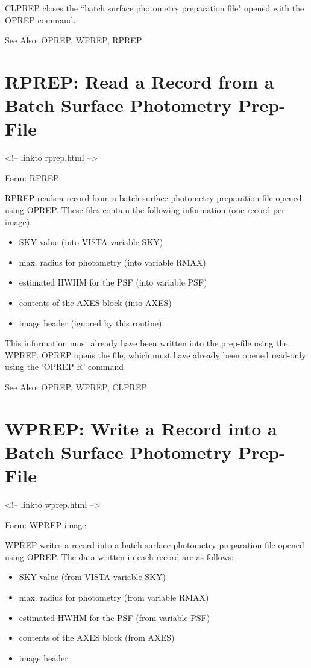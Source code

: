 CLPREP closes the ``batch surface photometry preparation file" opened with
the OPREP command.

See Also:  OPREP, WPREP, RPREP


\section{RPREP: Read a Record from a Batch Surface Photometry Prep-File}
\begin{rawhtml}
<!-- linkto rprep.html -->
\end{rawhtml}
\begin{command}
  \item[Form: RPREP\hfill]{}
\end{command}

RPREP reads a record from a batch surface photometry preparation file
opened using OPREP.  These files contain the following information (one
record per image):
\begin{itemize}
  \item{SKY value (into VISTA variable SKY)}
  \item{max. radius for photometry (into variable RMAX)}
  \item{estimated HWHM for the PSF (into variable PSF)}
  \item{contents of the AXES block (into AXES)}
  \item{image header (ignored by this routine).}
\end{itemize}

This information must already have been written into the prep-file using
the WPREP.  OPREP opens the file, which must have already been opened
read-only using the `OPREP R' command

See Also:  OPREP, WPREP, CLPREP


\section{WPREP: Write a Record into a Batch Surface Photometry Prep-File}
\begin{rawhtml}
<!-- linkto wprep.html -->
\end{rawhtml}
\begin{command}
  \item[Form: WPREP image\hfill]{}
\end{command}

WPREP writes a record into a batch surface photometry preparation file
opened using OPREP.  The data written in each record are as follows:
\begin{itemize}
  \item{SKY value (from VISTA variable SKY)}
  \item{max. radius for photometry (from variable RMAX)}
  \item{estimated HWHM for the PSF (from variable PSF)}
  \item{contents of the AXES block (from AXES)}
  \item{image header.}
\end{itemize}

